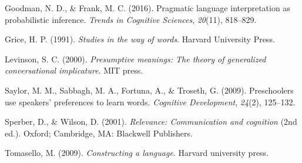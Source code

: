 \documentclass[10pt, letterpaper]{article}
\begin{document}
\hypertarget{ref-goodman2016pragmatic}{}
Goodman, N. D., \& Frank, M. C. (2016). Pragmatic language
interpretation as probabilistic inference. \emph{Trends in Cognitive
Sciences}, \emph{20}(11), 818--829.

\hypertarget{ref-grice1991studies}{}
Grice, H. P. (1991). \emph{Studies in the way of words}. Harvard
University Press.

\hypertarget{ref-levinson2000presumptive}{}
Levinson, S. C. (2000). \emph{Presumptive meanings: The theory of
generalized conversational implicature}. MIT press.

\hypertarget{ref-saylor2009preschoolers}{}
Saylor, M. M., Sabbagh, M. A., Fortuna, A., \& Troseth, G. (2009).
Preschoolers use speakers' preferences to learn words. \emph{Cognitive
Development}, \emph{24}(2), 125--132.

\hypertarget{ref-sperber2001relevance}{}
Sperber, D., \& Wilson, D. (2001). \emph{Relevance: Communication and
cognition} (2nd ed.). Oxford; Cambridge, MA: Blackwell Publishers.

\hypertarget{ref-tomasello2009constructing}{}
Tomasello, M. (2009). \emph{Constructing a language}. Harvard university
press.
\end{document}
